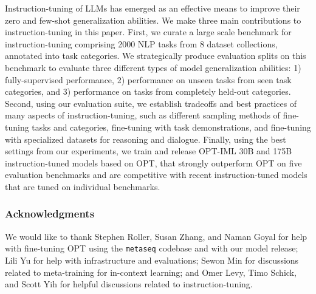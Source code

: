 Instruction-tuning of LLMs has emerged as an effective means to improve their zero and few-shot generalization abilities. We make three main contributions to instruction-tuning in this paper. First, we curate a large scale benchmark for instruction-tuning comprising 2000 NLP tasks from 8 dataset collections, annotated into task categories. We strategically produce evaluation splits on this benchmark to evaluate three different types of model generalization abilities: 1) fully-supervised performance, 2) performance on unseen tasks from seen task categories, and 3) performance on tasks from completely held-out categories. Second, using our evaluation suite, we establish  tradeoffs and best practices of many aspects of instruction-tuning, such as different sampling methods of fine-tuning tasks and categories, fine-tuning with task demonstrations, and fine-tuning with specialized datasets for reasoning and dialogue. Finally, using the best settings from our experiments, we train and release OPT-IML 30B and 175B instruction-tuned models based on OPT, that strongly outperform OPT on five evaluation benchmarks and are competitive with recent instruction-tuned models that are tuned on individual benchmarks.

\subsubsection*{Acknowledgments}
We would like to thank Stephen Roller, Susan Zhang, and Naman Goyal for help with fine-tuning OPT using the \texttt{metaseq} codebase and with our model release; Lili Yu for help with infrastructure and evaluations; Sewon Min for discussions related to meta-training for in-context learning; and Omer Levy, Timo Schick, and Scott Yih for helpful discussions related to instruction-tuning.


